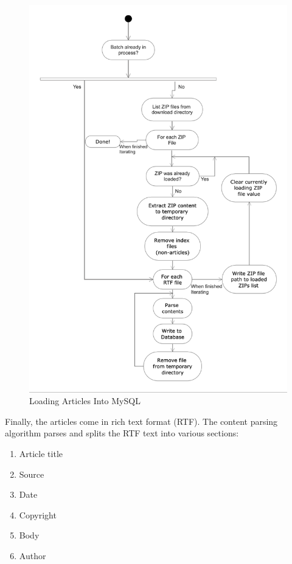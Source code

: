 \begin{figure}[H]
      \centering
      \includegraphics[scale=0.7]{method/db_loader.png}
      \caption{Loading Articles Into MySQL}
      \label{database loader}
\end{figure}

Finally, the articles come in rich text format (RTF). The content parsing algorithm parses and splits the RTF text into various sections:
\begin{enumerate}
    \item Article title
    \item Source
    \item Date
    \item Copyright
    \item Body
    \item Author
\end{enumerate}

